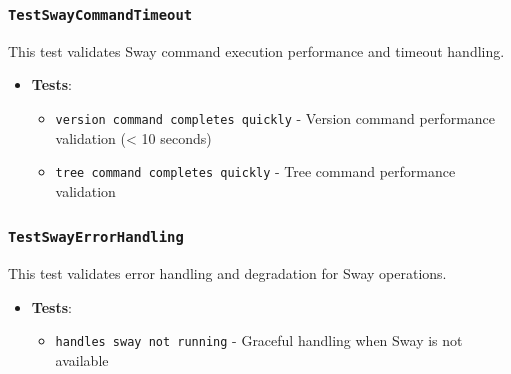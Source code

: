 \subsubsection*{\texttt{TestSwayCommandTimeout}}
This test validates Sway command execution performance and timeout handling.
\begin{itemize}
    \item \textbf{Tests}:
    \begin{itemize}
        \item \texttt{version command completes quickly} - Version command performance validation (< 10 seconds)
        \item \texttt{tree command completes quickly} - Tree command performance validation
    \end{itemize}
\end{itemize}

\subsubsection*{\texttt{TestSwayErrorHandling}}
This test validates error handling and degradation for Sway operations.
\begin{itemize}
    \item \textbf{Tests}:
    \begin{itemize}
        \item \texttt{handles sway not running} - Graceful handling when Sway is not available
    \end{itemize}
\end{itemize}
